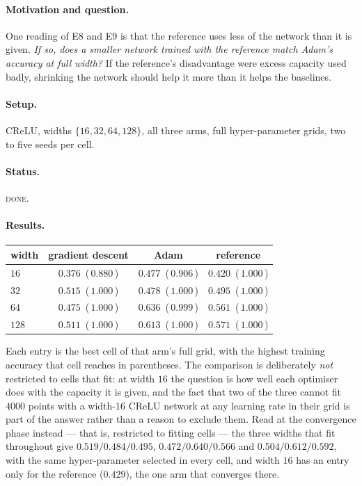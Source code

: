 \documentclass{article} %
\theoremstyle{plain}
\theoremstyle{definition}
\theoremstyle{remark}
\begin{document}
\paragraph{Motivation and question.}
One reading of E8 and E9 is that the reference uses less of the network than it is given. \emph{If
so, does a smaller network trained with the reference match Adam's accuracy at full width?} If the
reference's disadvantage were excess capacity used badly, shrinking the network should help it more
than it helps the baselines.

\paragraph{Setup.} CReLU, widths $\{16, 32, 64, 128\}$, all three arms, full hyper-parameter grids,
two to five seeds per cell.

\paragraph{Status.} \textsc{done}.

\paragraph{Results.}

\begin{center}\small
\begin{tabular}{lccc}
\toprule
width & gradient descent & Adam & reference \\
\midrule
$16$  & $0.376$ \,(\,$0.880$\,) & $\mathbf{0.477}$ \,(\,$0.906$\,) & $0.420$ \,(\,$1.000$\,) \\
$32$  & $\mathbf{0.515}$ \,(\,$1.000$\,) & $0.478$ \,(\,$1.000$\,) & $0.495$ \,(\,$1.000$\,) \\
$64$  & $0.475$ \,(\,$1.000$\,) & $\mathbf{0.636}$ \,(\,$0.999$\,) & $0.561$ \,(\,$1.000$\,) \\
$128$ & $0.511$ \,(\,$1.000$\,) & $\mathbf{0.613}$ \,(\,$1.000$\,) & $0.571$ \,(\,$1.000$\,) \\
\bottomrule
\end{tabular}
\end{center}

\noindent Each entry is the best cell of that arm's full grid, with the highest training accuracy
that cell reaches in parentheses. The comparison is deliberately \emph{not} restricted to cells
that fit: at width $16$ the question is how well each optimiser does with the capacity it is given,
and the fact that two of the three cannot fit $4000$ points with a width-$16$ CReLU network at any
learning rate in their grid is part of the answer rather than a reason to exclude them. Read at the
convergence phase instead --- that is, restricted to fitting cells --- the three widths that fit
throughout give $0.519/0.484/0.495$, $0.472/0.640/0.566$ and $0.504/0.612/0.592$, with the same
hyper-parameter selected in every cell, and width $16$ has an entry only for the reference
($0.429$), the one arm that converges there.
\end{document}

